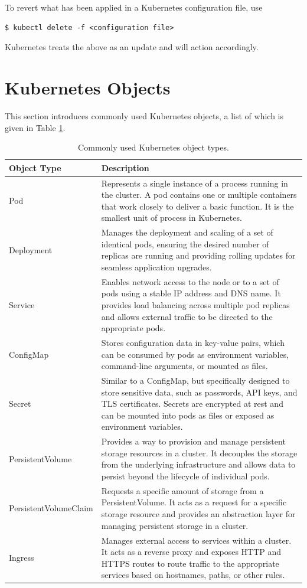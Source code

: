 To revert what has been applied in a Kubernetes configuration file, use
\begin{lstlisting}
$ kubectl delete -f <configuration file>
\end{lstlisting}
Kubernetes treats the above as an update and will action accordingly.

\section{Kubernetes Objects} \label{ch:vac:sec:objects}

This section introduces commonly used Kubernetes objects, a list of which is given in Table \ref{ch:vac:tab:objtype}.

\begin{table}[!htb]
	\centering
	\caption{Commonly used Kubernetes object types.} \label{ch:vac:tab:objtype}
	\begin{tabularx}{\textwidth}{lX}
		\hline
		Object Type & Description \\
		\hline
		Pod & Represents a single instance of a process running in the cluster. A pod contains one or multiple containers that work closely to deliver a basic function. It is the smallest unit of process in Kubernetes. \\ \hline
		Deployment & Manages the deployment and scaling of a set of identical pods, ensuring the desired number of replicas are running and providing rolling updates for seamless application upgrades. \\ \hline
		Service & Enables network access to the node or to a set of pods using a stable IP address and DNS name. It provides load balancing across multiple pod replicas and allows external traffic to be directed to the appropriate pods. \\ \hline
		ConfigMap & Stores configuration data in key-value pairs, which can be consumed by pods as environment variables, command-line arguments, or mounted as files. \\ \hline
		Secret & Similar to a ConfigMap, but specifically designed to store sensitive data, such as passwords, API keys, and TLS certificates. Secrets are encrypted at rest and can be mounted into pods as files or exposed as environment variables. \\ \hline
		PersistentVolume & Provides a way to provision and manage persistent storage resources in a cluster. It decouples the storage from the underlying infrastructure and allows data to persist beyond the lifecycle of individual pods. \\ \hline
		PersistentVolumeClaim & Requests a specific amount of storage from a PersistentVolume. It acts as a request for a specific storage resource and provides an abstraction layer for managing persistent storage in a cluster. \\ \hline
		Ingress & Manages external access to services within a cluster. It acts as a reverse proxy and exposes HTTP and HTTPS routes to route traffic to the appropriate services based on hostnames, paths, or other rules. \\
		\hline
	\end{tabularx}
\end{table}

